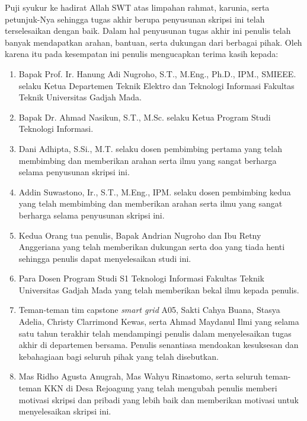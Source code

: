 Puji syukur ke hadirat Allah SWT atas limpahan rahmat, karunia, serta petunjuk-Nya sehingga tugas akhir berupa penyusunan skripsi ini telah terselesaikan dengan baik. Dalam hal penyusunan tugas akhir ini penulis telah banyak mendapatkan arahan, bantuan, serta dukungan dari berbagai pihak. Oleh karena itu pada kesempatan ini penulis mengucapkan terima kasih kepada:

\begin{enumerate}
	\item Bapak Prof. Ir. Hanung Adi Nugroho, S.T., M.Eng., Ph.D., IPM., SMIEEE. selaku Ketua Departemen Teknik Elektro dan Teknologi Informasi Fakultas Teknik Universitas Gadjah Mada.
	
	\item Bapak Dr. Ahmad Nasikun, S.T., M.Sc. selaku Ketua Program Studi Teknologi Informasi.
	
	\item Dani Adhipta, S.Si., M.T. selaku dosen pembimbing pertama yang telah membimbing dan memberikan arahan serta ilmu yang sangat berharga selama penyusunan skripsi ini.

	\item Addin Suwastono, Ir., S.T., M.Eng., IPM. selaku dosen pembimbing kedua yang telah membimbing dan memberikan arahan serta ilmu yang sangat berharga selama penyusunan skripsi ini.

	\item Kedua Orang tua penulis, Bapak Andrian Nugroho dan Ibu Retny Anggeriana yang telah memberikan dukungan serta doa yang tiada henti sehingga penulis dapat menyelesaikan studi ini.

	\item Para Dosen Program Studi S1 Teknologi Informasi Fakultas Teknik Universitas Gadjah Mada yang telah memberikan bekal ilmu kepada penulis.
	
	\item Teman-teman tim capstone \textit{smart grid} A05, Sakti Cahya Buana, Stasya Adelia, Christy Clarrimond Kewas, serta Ahmad Maydanul Ilmi yang selama satu tahun terakhir telah mendampingi penulis dalam menyelesaikan tugas akhir di departemen bersama. Penulis senantiasa mendoakan kesuksesan dan kebahagiaan bagi seluruh pihak yang telah disebutkan.

	\item Mas Ridho Agusta Anugrah, Mas	Wahyu Rinastomo, serta seluruh teman-teman KKN di Desa Rejoagung yang telah mengubah penulis memberi motivasi skripsi dan pribadi yang lebih baik dan memberikan motivasi untuk menyelesaikan skripsi ini.
\end{enumerate}

